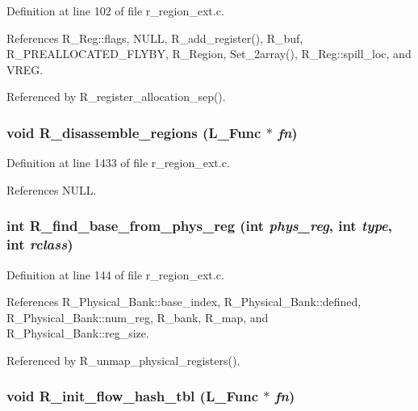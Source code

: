 Definition at line 102 of file r\_\-region\_\-ext.c.

References R\_\-Reg::flags, NULL, R\_\-add\_\-register(), R\_\-buf, R\_\-PREALLOCATED\_\-FLYBY, R\_\-Region, Set\_\-2array(), R\_\-Reg::spill\_\-loc, and VREG.

Referenced by R\_\-register\_\-allocation\_\-sep().
\subsubsection{\setlength{\rightskip}{0pt plus 5cm}void R\_\-disassemble\_\-regions (L\_\-Func $\ast$ {\em fn})}\label{r__region__ext_8c_5e2fdcfcf633ffd0a09a99d2a001f2e5}




Definition at line 1433 of file r\_\-region\_\-ext.c.

References NULL.
\subsubsection{\setlength{\rightskip}{0pt plus 5cm}int R\_\-find\_\-base\_\-from\_\-phys\_\-reg (int {\em phys\_\-reg}, int {\em type}, int {\em rclass})}\label{r__region__ext_8c_d5319db9254920f1201b01c6012b4e77}




Definition at line 144 of file r\_\-region\_\-ext.c.

References R\_\-Physical\_\-Bank::base\_\-index, R\_\-Physical\_\-Bank::defined, R\_\-Physical\_\-Bank::num\_\-reg, R\_\-bank, R\_\-map, and R\_\-Physical\_\-Bank::reg\_\-size.

Referenced by R\_\-unmap\_\-physical\_\-registers().
\subsubsection{\setlength{\rightskip}{0pt plus 5cm}void R\_\-init\_\-flow\_\-hash\_\-tbl (L\_\-Func $\ast$ {\em fn})}\label{r__region__ext_8c_015241c492147f1b6ce5934ea1e1256f}




